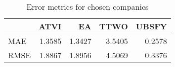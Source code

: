 \begin{table}
\centering
\caption{Error metrics for chosen companies}
\begin{tabular}{lrrrr}
\toprule
{} &    ATVI &      EA &    TTWO &   UBSFY \\
\midrule
MAE  &  1.3585 &  1.3427 &  3.5405 &  0.2578 \\
RMSE &  1.8867 &  1.8956 &  4.5069 &  0.3376 \\
\bottomrule
\end{tabular}
\end{table}

